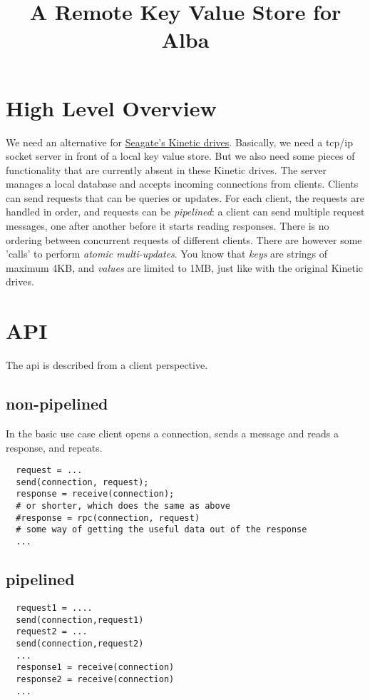\documentclass{article}
\title{A Remote Key Value Store for Alba}
\begin{document}
\maketitle
\section{High Level Overview}
We need an alternative for \href{https://developers.seagate.com/display/KV/Kinetic+Open+Storage+Documentation+Wiki}{Seagate's Kinetic drives}.
Basically, we need a tcp/ip socket server in front of a local key value store.
But we also need some pieces of functionality that are currently absent
in these Kinetic drives.
The server manages a local database and accepts incoming connections from clients.
Clients can send requests that can be queries or updates.
For each client, the requests are handled in order,
and requests can be \emph{pipelined}: a client can send multiple request messages,
one after another before it starts reading responses.
There is no ordering between concurrent requests of different clients.
There are however some 'calls' to perform \emph{atomic multi-updates}.
You know that \emph{keys} are strings of maximum 4KB,
and \emph{values} are limited to 1MB,
just like with the original Kinetic drives.

\section{API}
The api is described from a client perspective.
\subsection{non-pipelined}
In the basic use case client opens a connection,
sends a message and reads a response, and repeats.
\begin{lstlisting}
  request = ...
  send(connection, request);
  response = receive(connection);
  # or shorter, which does the same as above
  #response = rpc(connection, request)
  # some way of getting the useful data out of the response
  ...
\end{lstlisting}
\subsection{pipelined}
\begin{lstlisting}
  request1 = ....
  send(connection,request1)
  request2 = ...
  send(connection,request2)
  ...
  response1 = receive(connection)
  response2 = receive(connection)
  ...
\end{lstlisting}
\end{document}
